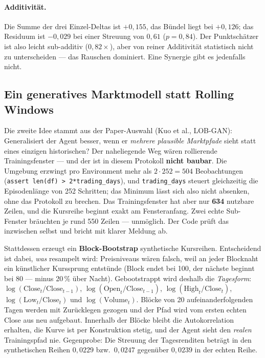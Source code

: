 \paragraph{Additivität.} Die Summe der drei Einzel-Deltas ist $+0{,}155$, das Bündel
liegt bei $+0{,}126$; das Residuum ist $-0{,}029$ bei einer Streuung von $0{,}61$
($p=0{,}84$). Der Punktschätzer ist also leicht sub-additiv ($0{,}82\times$), aber von
reiner Additivität statistisch nicht zu unterscheiden --- das Rauschen dominiert.
Eine Synergie gibt es jedenfalls nicht.

\subsection{Ein generatives Marktmodell statt Rolling Windows}

Die zweite Idee stammt aus der Paper-Auswahl (Kuo et al., LOB-GAN):
Generalisiert der Agent besser, wenn er \emph{mehrere plausible Marktpfade} sieht statt
eines einzigen historischen? Der naheliegende Weg wären rollierende Trainingsfenster ---
und der ist in diesem Protokoll \textbf{nicht baubar}. Die Umgebung erzwingt pro
Environment mehr als $2 \cdot 252 = 504$ Beobachtungen (\texttt{assert len(df) >
2*trading\_days}), und \texttt{trading\_days} steuert gleichzeitig die Episodenlänge von
252 Schritten; das Minimum lässt sich also nicht absenken, ohne das Protokoll zu brechen.
Das Trainingsfenster hat aber nur \textbf{634} nutzbare Zeilen, und die Kursreihe beginnt
exakt am Fensteranfang. Zwei echte Sub-Fenster bräuchten je rund 550 Zeilen --- unmöglich.
Der Code prüft das inzwischen selbst und bricht mit klarer Meldung ab.

Stattdessen erzeugt ein \textbf{Block-Bootstrap} synthetische Kursreihen. Entscheidend ist
dabei, \emph{was} resampelt wird: Preisniveaus wären falsch, weil an jeder Blocknaht ein
künstlicher Kurssprung entstünde (Block endet bei 100, der nächste beginnt bei 80 ---
minus 20\,\% über Nacht). Gebootstrappt wird deshalb die \emph{Tagesform}:
$\log(\text{Close}_t/\text{Close}_{t-1})$, $\log(\text{Open}_t/\text{Close}_{t-1})$,
$\log(\text{High}_t/\text{Close}_t)$, $\log(\text{Low}_t/\text{Close}_t)$ und
$\log(\text{Volume}_t)$. Blöcke von 20 aufeinanderfolgenden Tagen werden mit Zurücklegen
gezogen und der Pfad wird vom ersten echten Close aus neu aufgebaut. Innerhalb der Blöcke
bleibt die Autokorrelation erhalten, die Kurve ist per Konstruktion stetig, und der Agent
sieht den \emph{realen} Trainingspfad nie. Gegenprobe: Die Streuung der Tagesrenditen
beträgt in den synthetischen Reihen $0{,}0229$ bzw.\ $0{,}0247$ gegenüber $0{,}0239$ in
der echten Reihe.

